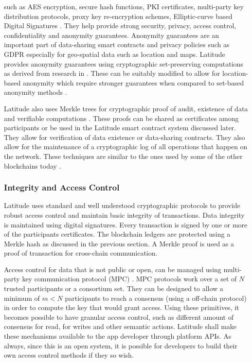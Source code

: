 such as AES encryption, secure hash functions, PKI certificates, multi-party key distribution protocols, proxy key
re-encryption schemes, Elliptic-curve based Digital Signatures \cite{ecdsa}. They help provide strong security, privacy,
access control, confidentiality and anonymity guarantees. Anonymity guarantees are an important part of data-sharing
smart contracts and privacy policies such as GDPR \cite{gdpr} especially for geo-spatial data such as location and maps.
Latitude provides anonymity guarantees using cryptographic set-preserving computations as derived from research in
\cite{kissner_set}. These can be suitably modified to allow for location-based anonymity which require stronger
guarantees when compared to set-based anonymity methods \cite{divanis_kanon,xu_loc_anon}.

Latitude also uses Merkle trees for cryptographic proof of audit, existence of data and verifiable computations
\cite{becker2008}. These proofs can be shared as certificates among participants or be used in the Latitude smart
contract system discussed later. They allow for verification of data existence or data-sharing contracts. They also
allow for the maintenance of a cryptographic log of all operations that happen on the network. These techniques are
similar to the ones used by some of the other blockchains today \cite{buterin_merkle}.

\subsubsection{Integrity and Access Control}

Latitude uses standard and well understood cryptographic protocols to provide robust access control and maintain basic
integrity of transactions. Data integrity is maintained using digital signatures. Every transaction is signed by one or more of the participants
certificates. The blockchain ledgers are protected using a Merkle hash \cite{becker2008} as discussed in the previous
section. A Merkle proof is used as a proof of transaction for cross-chain communication.

Access control for data that is not public or open, can be managed using multi-party key communication protocol (MPC)
\cite{enigma, nucypher, mpc_survey}. MPC protocols work over a set of $N$ trusted participants or a consortium set. They
can be designed to allow a minimum of $m<N$ participants to reach a consensus (using a off-chain protocol) in order to
compute the key that would grant access. Using these primitives, it becomes possible to have granular access control,
such as different amount of consensus for read, for writes and other semantic actions. Latitude shall make these
mechanisms available to the app developer through platform APIs. As always, since this is an open system, it is possible
for developers to build their own access control methods if they so wish.

